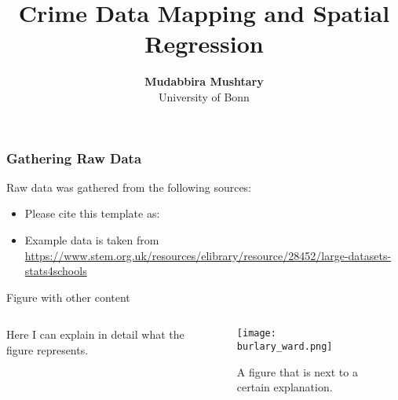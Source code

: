 \documentclass[11pt, aspectratio=169]{beamer}
\begin{document}
\title{Crime Data Mapping and Spatial Regression}

\author[Mudabbira Mushtary]
{
{\bf Mudabbira Mushtary}\\
{\small University of Bonn}\\[1ex]
}


\begin{frame}
    \titlepage
    \note{~}
\end{frame}

\begin{frame}[t]
    \frametitle{Gathering Raw Data}
    Raw data was gathered from the following sources:
    \begin{itemize}
        \item Please cite this template as: \citet{GaudeckerEconProjectTemplates}
        \item Example data is taken from \url{https://www.stem.org.uk/resources/elibrary/resource/28452/large-datasets-stats4schools}
    \end{itemize}
    \note{~}
\end{frame}





\begin{frame}{Figure with other content}
    \begin{columns}
        \begin{column}{0.5\textwidth}
                Here I can explain in detail what the figure represents.
        \end{column}
        \begin{column}{0.5\textwidth}
            \begin{figure}
            \centering
                \texttt{[image: burlary\_ward.png]}
                \caption{A figure that is next to a certain explanation.}
            \end{figure}
        \end{column}
    \end{columns}
\end{frame}
\end{document}

